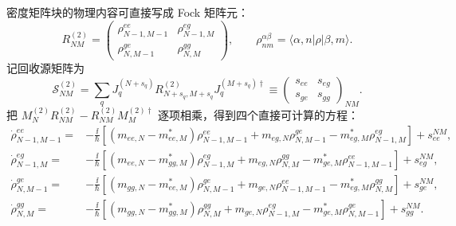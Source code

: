 密度矩阵块的物理内容可直接写成 Fock 矩阵元：
\[
R_{NM}^{(2)}=
\begin{pmatrix}
\rho_{N-1,M-1}^{ee}&\rho_{N-1,M}^{eg}\\
\rho_{N,M-1}^{ge}&\rho_{N,M}^{gg}
\end{pmatrix},
\qquad
\rho_{nm}^{\alpha\beta}=\langle\alpha,n|\rho|\beta,m\rangle.
\]
记回收源矩阵为
\[
\mathcal S_{NM}^{(2)}=
\sum_qJ_q^{(N+s_q)}R_{N+s_q,M+s_q}^{(2)}J_q^{(M+s_q)\dagger}
\equiv
\begin{pmatrix}s_{ee}&s_{eg}\\s_{ge}&s_{gg}\end{pmatrix}_{NM}.
\]
把 $M_N^{(2)}R_{NM}^{(2)}-R_{NM}^{(2)}M_M^{(2)\dagger}$ 逐项相乘，得到四个直接可计算的方程：
\[
\begin{aligned}
\dot\rho_{N-1,M-1}^{ee}
={}&-\frac{\ii}{\hbar}
\left[(m_{ee,N}-m_{ee,M}^*)\rho_{N-1,M-1}^{ee}
+m_{eg,N}\rho_{N,M-1}^{ge}
-m_{eg,M}^*\rho_{N-1,M}^{eg}\right]+s_{ee}^{NM},\\
\dot\rho_{N-1,M}^{eg}
={}&-\frac{\ii}{\hbar}
\left[(m_{ee,N}-m_{gg,M}^*)\rho_{N-1,M}^{eg}
+m_{eg,N}\rho_{N,M}^{gg}
-m_{ge,M}^*\rho_{N-1,M-1}^{ee}\right]+s_{eg}^{NM},\\
\dot\rho_{N,M-1}^{ge}
={}&-\frac{\ii}{\hbar}
\left[(m_{gg,N}-m_{ee,M}^*)\rho_{N,M-1}^{ge}
+m_{ge,N}\rho_{N-1,M-1}^{ee}
-m_{eg,M}^*\rho_{N,M}^{gg}\right]+s_{ge}^{NM},\\
\dot\rho_{N,M}^{gg}
={}&-\frac{\ii}{\hbar}
\left[(m_{gg,N}-m_{gg,M}^*)\rho_{N,M}^{gg}
+m_{ge,N}\rho_{N-1,M}^{eg}
-m_{ge,M}^*\rho_{N,M-1}^{ge}\right]+s_{gg}^{NM}.
\end{aligned}
\]

